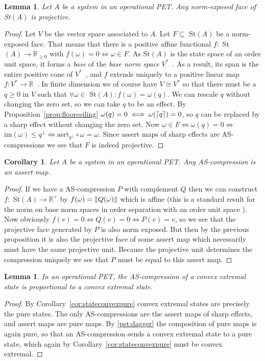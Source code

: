 \documentclass[a4paper,onecolumn,10pt,accepted=2019-05-03, issue=1, volume=1, shorttitle=papers/compositionality-1-1]{compositionalityarticle}
\DeclarePairedDelimiter{\ceil}{\lceil}{\rceil}
\newcounter{counter}
\numberwithin{counter}{section}
\newtheorem{lemma}[counter]{Lemma}
\newtheorem{corollary}[counter]{Corollary}
\newcommand{\R}{\mathbb{R}}
\newcommand{\asrt}{\text{asrt}}
\newcommand{\im}[1]{\text{im}(#1)}
\begin{document}
\begin{lemma}\label{lem:normexposed}
	Let $A$ be a system in an operational PET. Any norm-exposed face of St$(A)$ is projective.
\end{lemma}
\begin{proof}
	Let $V$ be the vector space associated to $A$. Let $F\subseteq $ St$(A)$ be a norm-exposed face. That means that there is a positive affine functional $f:$ St$(A)\rightarrow \R_{\geq 0}$ with $f(\omega)=0\iff \omega\in F$. As St$(A)$ is the state space of an order unit space, it forms a \emph{base} of the \emph{base norm space} $V^*$~\cite[Theorem 1.19]{alfsen2012state}. As a result, its span is the entire positive cone of $V^*$~\cite[Definition 1.10]{alfsen2012state}, and $f$ extends uniquely to a positive linear map $f:V^*\rightarrow \R$~\cite[Proposition 1.11]{alfsen2012state}. In finite dimension we of course have $V\cong V^*$ so that there must be a $q\geq 0$ in $V$ such that $\forall \omega\in$ St$(A): f(\omega) = \omega(q)$. We can rescale $q$ without changing the zero set, so we can take $q$ to be an effect. By Proposition~\ref{prop:floorceiling} $\omega(q)=0\iff \omega(\ceil{q})=0$, so $q$ can be replaced by a sharp effect without changing the zero set. Now $\omega \in F \iff \omega(q)=0 \iff $ $\im{\omega}\leq q^\perp \iff \asrt_{q^\perp}\circ \omega = \omega$. Since assert maps of sharp effects are AS-compressions we see that $F$ is indeed projective.
\end{proof}

\begin{corollary} \label{cor:comp-assert}
	Let $A$ be a system in an operational PET. Any AS-compression is an assert map.
\end{corollary}
\begin{proof}
	If we have a AS-compression $P$ with complement $Q$ then we can construct $f:$ St$(A)\rightarrow \R^+$ by $f(\omega) = \norm{Q(\omega)}$ which is affine (this is a standard result for the norm on base norm spaces in order separation with an order unit space \cite{alfsen2012geometry}). Now obviously $f(v)=0 \iff Q(v)=0 \iff P(v)=v$, so we see that the projective face generated by $P$ is also norm exposed. But then by the previous proposition it is also the projective face of some assert map which necessarily must have the same projective unit. Because the projective unit determines the compression uniquely we see that $P$ must be equal to this assert map.
\end{proof}


\begin{lemma}\label{lem:compressionpure}
	In an operational PET, the AS-compression of a convex extremal state is proportional to a convex extremal state.
\end{lemma}
\begin{proof}
    By Corollary~\ref{cor:stateconvexpure} convex extremal states are precisely the pure states.
	The only AS-compressions are the assert maps of sharp effects, and assert maps are pure maps. By \ref{pet:dagger} the composition of pure maps is again pure, so that an AS-compression sends a convex extremal state to a pure state, which again by Corollary~\ref{cor:stateconvexpure} must be convex extremal.
\end{proof}
\end{document}
